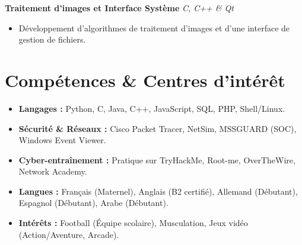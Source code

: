 \documentclass[10pt, a4paper]{article}
\begin{document}
\vspace{6pt}

\textbf{Traitement d'images et Interface Système} \hfill \textit{C, C++ \& Qt}
\begin{itemize}
    \item Développement d'algorithmes de traitement d'images et d'une interface de gestion de fichiers.
\end{itemize}

\section{Compétences \& Centres d'intérêt}
\begin{itemize}
    \item \textbf{Langages :} Python, C, Java, C++, JavaScript, SQL, PHP, Shell/Linux.
    \item \textbf{Sécurité \& Réseaux :} Cisco Packet Tracer, NetSim, MSSGUARD (SOC), Windows Event Viewer.
    \item \textbf{Cyber-entraînement :} Pratique sur TryHackMe, Root-me, OverTheWire, Network Academy.
    \item \textbf{Langues :} Français (Maternel), Anglais (B2 certifié), Allemand (Débutant), Espagnol (Débutant), Arabe (Débutant).
    \item \textbf{Intérêts :} Football (Équipe scolaire), Musculation, Jeux vidéo (Action/Aventure, Arcade).
\end{itemize}
\end{document}

